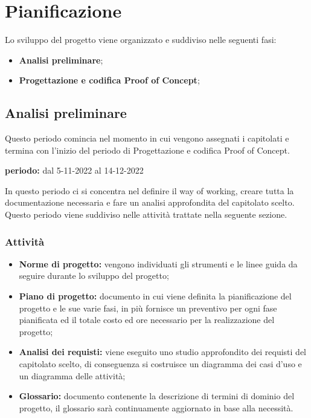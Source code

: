 \section{Pianificazione}
Lo sviluppo del progetto viene organizzato e suddiviso nelle seguenti fasi:
\begin{itemize}
\item \textbf{Analisi preliminare};
\item \textbf{Progettazione e codifica Proof of Concept};
\end{itemize}


\subsection{Analisi preliminare}
Questo periodo comincia nel momento in cui vengono assegnati i capitolati e termina con l'inizio del periodo di Progettazione e codifica Proof of Concept.\\
\begin{center}
\textbf{periodo:} dal 5-11-2022 al 14-12-2022\\
\end{center}
In questo periodo ci si concentra nel definire il way of working, creare tutta la documentazione necessaria e fare un analisi approfondita del capitolato scelto.  Questo periodo viene suddiviso nelle attività trattate nella seguente sezione.

\subsubsection{Attività}
\begin{itemize}
\item \textbf{Norme di progetto:} vengono individuati gli strumenti e le linee guida da seguire durante lo sviluppo del progetto;
\item \textbf{Piano di progetto:} documento in cui viene definita la pianificazione del progetto e le sue varie fasi,  in più fornisce un preventivo per ogni fase pianificata ed il totale costo ed ore necessario per la realizzazione del progetto;
\item \textbf{Analisi dei requisti:} viene eseguito uno studio approfondito dei requisti del capitolato scelto,  di conseguenza si costruisce un diagramma dei casi d'uso e un diagramma delle attività;
\item \textbf{Glossario: } documento contenente la descrizione di termini di dominio del progetto, il glossario sarà continuamente aggiornato in base alla necessità.
\end{itemize}

